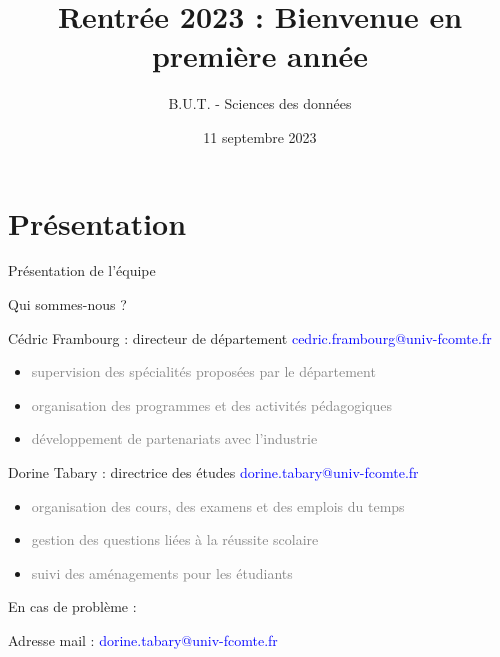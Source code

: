 \documentclass [xcolor=x11names,t] {beamer}
\title[Rentrée 2023]{Rentrée 2023 : Bienvenue en première année }
\institute[]{%
}
\author[Dorine Tabary, Cédric Frambourg]{
	B.U.T. - Sciences des données}
\date{11 septembre 2023 }
\begin{document}
\begin{frame}
\maketitle
\end{frame}



\section{Présentation}
\begin{frame}{Présentation de l'équipe}
\begin{block}{Qui sommes-nous ?}


Cédric Frambourg : directeur de département \textcolor{blue}{cedric.frambourg@univ-fcomte.fr}    

\begin{itemize}
    \item \textcolor{gray}{supervision des spécialités proposées par le département}
    \item \textcolor{gray}{organisation des programmes et des activités pédagogiques}
   \item  \textcolor{gray}{développement de partenariats avec l'industrie}
\end{itemize}

Dorine Tabary : directrice des études \textcolor{blue}{dorine.tabary@univ-fcomte.fr}

\begin{itemize}
    \item \textcolor{gray}{organisation des cours, des examens et des emplois du temps}
    \item \textcolor{gray}{gestion des questions liées à la réussite scolaire}
    \item \textcolor{gray}{suivi des aménagements pour les étudiants}
\end{itemize}
\end{block}

\begin{alertblock}{En cas de problème :}

Adresse mail : \textcolor{blue}{dorine.tabary@univ-fcomte.fr}
\end{alertblock}


\end{frame}
\end{document}
